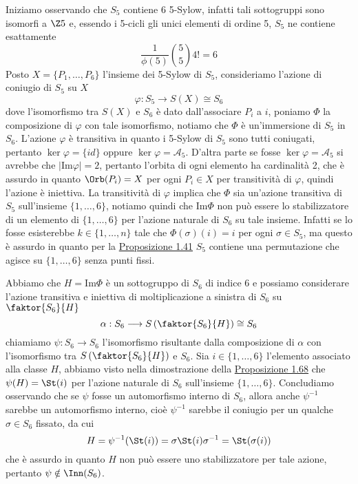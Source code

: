 \documentclass[11pt]{scrartcl}
\begin{document}
Iniziamo osservando che $S_5$ contiene 6 5-Sylow, infatti tali sottogruppi 
sono isomorfi a $\Z5$ e, essendo i 5-cicli gli unici elementi di ordine 5,
$S_5$ ne contiene esattamente 
\[
    \frac{1}{\phi(5)} \binom{5}{5}4! = 6
\]
Posto $X = \{P_1, \ldots, P_6\}$ l'insieme dei 5-Sylow di $S_5$, consideriamo l'azione di coniugio 
di $S_5$ su $X$
\[
    \varphi: S_5 \longrightarrow S(X) \cong S_6
\]
dove l'isomorfismo tra $S(X)$ e $S_6$ è dato dall'associare $P_i$ a $i$, 
poniamo $\Phi$ la composizione di $\varphi$ con tale isomorfismo, notiamo
che $\Phi$ è un'immersione di $S_5$ in $S_6$. L'azione 
$\varphi$ è transitiva in quanto i 5-Sylow di $S_5$ sono tutti coniugati,
pertanto $\ker\varphi = \{id\}$ oppure $\ker\varphi = \mathcal{A}_5$. D'altra parte
se fosse $\ker\varphi = \mathcal{A}_5$ si avrebbe che $|\mathrm{Im}\varphi| = 2$,
pertanto l'orbita di ogni elemento ha cardinalità 2, che è assurdo in quanto
$\Orb(P_i) = X$ per ogni $P_i \in X$ per transitività di $\varphi$, quindi l'azione
è iniettiva.\newline
La transitività di $\varphi$ implica che $\Phi$ sia un'azione transitiva
di $S_5$ sull'insieme $\{1, \ldots, 6\}$, notiamo quindi che $\mathrm{Im}\Phi$
non può essere lo stabilizzatore di un elemento di $\{1, \ldots, 6\}$
per l'azione naturale di $S_6$ su tale insieme. Infatti se lo fosse esisterebbe
$k \in \{1, \ldots, n\}$ tale che $\Phi(\sigma)(i) = i$ per ogni $\sigma \in S_5$,
ma questo è assurdo in quanto per la \hyperref[prop1.41]{Proposizione 1.41} 
$S_5$ contiene una permutazione che agisce su $\{1, \ldots, 6\}$ senza punti
fissi.

Abbiamo che $H = \mathrm{Im}\Phi$ è un sottogruppo di $S_6$ di indice $6$ e possiamo
considerare l'azione transitiva e iniettiva di moltiplicazione a sinistra di $S_6$ su 
$\faktor{S_6}{H}$
\[
    \alpha: S_6\longrightarrow S\left(\faktor{S_6}{H}\right) \cong S_6
\]
chiamiamo $\psi: S_6\longrightarrow S_6$ l'isomorfismo risultante dalla
composizione di $\alpha$ con l'isomorfismo tra $S\left(\faktor{S_6}{H}\right)$
e $S_6$. Sia $i \in \{1, \ldots, 6\}$ l'elemento associato alla classe $H$,
abbiamo visto nella dimostrazione della \hyperref[prop1.68]{Proposizione 1.68}
che $\psi(H) = \St(i)$ per l'azione naturale di $S_6$ sull'insieme $\{1, \ldots, 6\}$.
Concludiamo osservando che se $\psi$ fosse un automorfismo interno di $S_6$,
allora anche $\psi^{-1}$ sarebbe un automorfismo interno, cioè $\psi^{-1}$
sarebbe il coniugio per un qualche $\sigma \in S_6$ fissato, da cui
\[
    H = \psi^{-1}(\St(i)) = \sigma\St(i)\sigma^{-1} = \St(\sigma(i))
\]
che è assurdo in quanto $H$ non può essere uno stabilizzatore per tale azione,
pertanto $\psi \notin \Inn(S_6)$.
\end{document}
